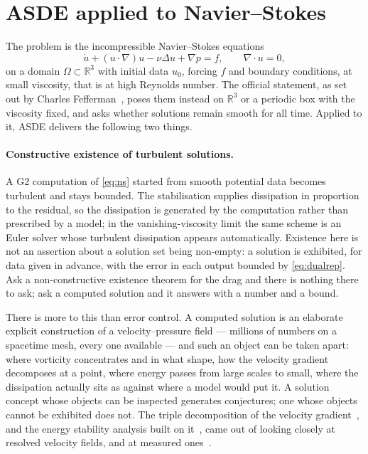 \documentclass[11pt]{article}
\newcommand{\grad}{\nabla}
\begin{document}
\section{ASDE applied to Navier--Stokes}\label{sec:ns}

The problem is the incompressible Navier--Stokes equations
\begin{equation}\label{eq:ns}
\dot u + (u\cdot\grad)u - \nu\Delta u + \grad p = f,\qquad \grad\cdot u = 0,
\end{equation}
on a domain $\Omega\subset\mathbb{R}^3$ with initial data $u_0$, forcing $f$ and boundary
conditions, at small viscosity, that is at high Reynolds number. The official statement, as set out
by Charles Fefferman~\cite{fefferman}, poses them instead on $\mathbb{R}^3$ or a periodic box with
the viscosity fixed, and asks whether solutions remain smooth for all time. Applied to it, ASDE delivers the
following two things.

\paragraph{Constructive existence of turbulent solutions.} A G2 computation of \eqref{eq:ns}
started from smooth potential data becomes turbulent and stays bounded. The stabilisation supplies
dissipation in proportion to the residual, so the dissipation is generated by the computation
rather than prescribed by a model; in the vanishing-viscosity limit the same scheme is an Euler
solver whose turbulent dissipation appears automatically. Existence here is not an assertion about
a solution set being non-empty: a solution is exhibited, for data given in advance, with the error
in each output bounded by \eqref{eq:dualrep}. Ask a non-constructive existence theorem for the drag
and there is nothing there to ask; ask a computed solution and it answers with a number and a bound.

There is more to this than error control. A computed solution is an elaborate explicit construction
of a velocity--pressure field --- millions of numbers on a spacetime mesh, every one available ---
and such an object can be taken apart: where vorticity concentrates and in what shape, how the
velocity gradient decomposes at a point, where energy passes from large scales to small, where the
dissipation actually sits as against where a model would put it. A solution concept whose objects
can be inspected generates conjectures; one whose objects cannot be exhibited does not. The triple
decomposition of the velocity gradient~\cite{triple}, and the energy stability analysis built on
it~\cite{energystab}, came out of looking closely at resolved velocity fields, and at measured
ones~\cite{musci}.
\end{document}
